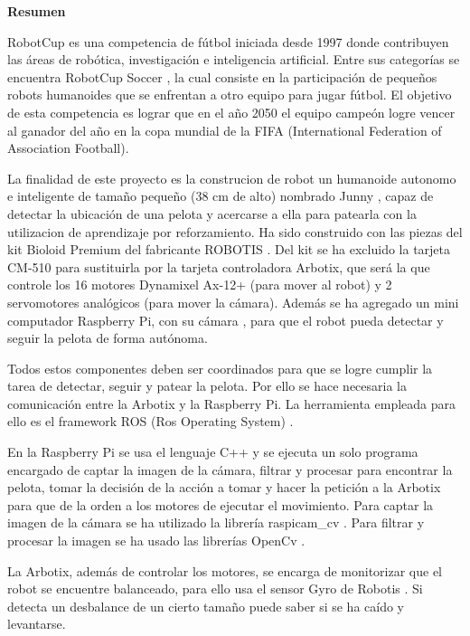 \setcounter{page}{4}
\begin{center}
	{\bf Resumen}  %
\end{center}	

RobotCup \cite{robotcup} es una competencia de fútbol iniciada desde 1997 donde contribuyen las áreas de robótica, investigación e inteligencia artificial. Entre sus categorías se encuentra RobotCup Soccer \cite{robotcupsoccer}, la cual consiste en la participación de pequeños robots humanoides que se enfrentan a otro equipo para jugar fútbol. El objetivo de esta competencia es lograr que en el año 2050 el equipo campeón logre vencer al ganador del año en la copa mundial de la FIFA (International Federation of Association Football).

La finalidad de este proyecto es la construcion de robot un humanoide autonomo e inteligente de tamaño pequeño (38 cm de alto) nombrado Junny , capaz de detectar la ubicación de una pelota y acercarse a ella para patearla con la utilizacion de aprendizaje por reforzamiento. Ha sido construido con las piezas del kit Bioloid Premium \cite{robotics} del fabricante ROBOTIS \cite{robotics1}. Del kit se ha excluido la tarjeta CM-510 para sustituirla por la tarjeta controladora Arbotix, que será la que controle los 16 motores Dynamixel Ax-12+ (para mover al robot) y 2 servomotores analógicos (para mover la cámara). Además se ha agregado un mini computador Raspberry Pi, con su cámara \cite{raspberrycam}, para que el robot pueda detectar y seguir la pelota de forma autónoma. 

Todos estos componentes deben ser coordinados para que se logre cumplir la tarea de detectar, seguir y patear la pelota. Por ello se hace necesaria la comunicación entre la Arbotix y la Raspberry Pi. La herramienta empleada para ello es el framework ROS (Ros Operating System) \cite{ros}.

En la Raspberry Pi se usa el lenguaje C++ y se ejecuta un solo programa encargado de captar la imagen de la cámara, filtrar y procesar para encontrar la pelota, tomar la decisión de la acción a tomar y hacer la petición a la Arbotix para que de la orden a los motores de ejecutar el movimiento. Para captar la imagen de la cámara se ha utilizado la librería raspicam\_cv \cite{camara}. Para filtrar y procesar la imagen se ha usado las librerías OpenCv \cite{opencv}. 

La Arbotix, además de controlar los motores, se encarga de monitorizar que el robot se encuentre balanceado, para ello usa el sensor Gyro de Robotis \cite{gyro}. Si detecta un desbalance de un cierto tamaño puede saber si se ha caído y levantarse. 